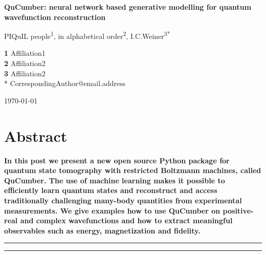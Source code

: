 \documentclass[submission, Phys]{SciPost}
\begin{document}
\begin{center}{\Large \textbf{
QuCumber: neural network based generative modelling for quantum wavefunction reconstruction
}}\end{center}

\begin{center}
PIQuIL people\textsuperscript{1},
in alphabetical order\textsuperscript{2},
I.C.Weiner\textsuperscript{3*}
\end{center}

\begin{center}
{\bf 1} Affiliation1
\\
{\bf 2} Affiliation2
\\
{\bf 3} Affiliation2
\\
* CorrespondingAuthor@email.address
\end{center}

\begin{center}
\today
\end{center}


\section*{Abstract}
{\bf
In this post we present a new open source Python package for quantum state tomography with restricted Boltzmann machines, called QuCumber. The use of machine learning makes it possible to efficiently learn quantum states and reconstruct and access traditionally challenging many-body quantities from experimental measurements. We give examples how to use QuCumber on positive-real and complex wavefunctions and how to extract meaningful observables such as energy, magnetization and fidelity.
}


\vspace{10pt}
\noindent\rule{\textwidth}{1pt}
\tableofcontents\thispagestyle{fancy}
\noindent\rule{\textwidth}{1pt}
\vspace{10pt}
\end{document}
